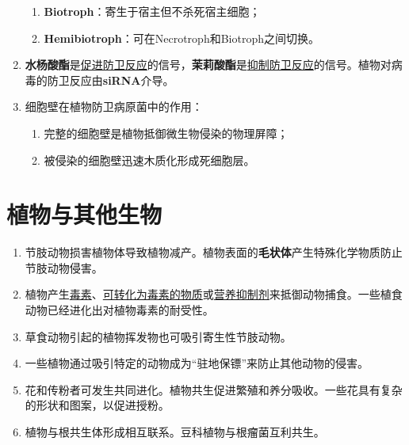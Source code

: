 \begin{enumerate}
\begin{enumerate}
        \item \textbf{Biotroph}：寄生于宿主但不杀死宿主细胞；
        \item \textbf{Hemibiotroph}：可在Necrotroph和Biotroph之间切换。
    \end{enumerate}
    \item \textbf{水杨酸酯}是\uline{促进防卫反应}的信号，\textbf{茉莉酸酯}是\uline{抑制防卫反应}的信号。植物对病毒的防卫反应由\textbf{siRNA}介导。
    \item 细胞壁在植物防卫病原菌中的作用：
    \begin{enumerate}
        \item 完整的细胞壁是植物抵御微生物侵染的物理屏障；
        \item 被侵染的细胞壁迅速木质化形成死细胞层。
    \end{enumerate}
\end{enumerate}

\section{植物与其他生物}
\begin{enumerate}
    \item 节肢动物损害植物体导致植物减产。植物表面的\textbf{毛状体}产生特殊化学物质防止节肢动物侵害。
    \item 植物产生\uline{毒素}、\uline{可转化为毒素的物质}或\uline{营养抑制剂}来抵御动物捕食。一些植食动物已经进化出对植物毒素的耐受性。
    \item 草食动物引起的植物挥发物也可吸引寄生性节肢动物。
    \item 一些植物通过吸引特定的动物成为“驻地保镖”来防止其他动物的侵害。
    \item 花和传粉者可发生共同进化。植物共生促进繁殖和养分吸收。一些花具有复杂的形状和图案，以促进授粉。
    \item 植物与根共生体形成相互联系。豆科植物与根瘤菌互利共生。
\end{enumerate}